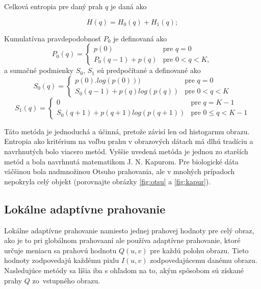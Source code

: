 \documentclass[a4paper,11pt,oneside]{article}%
\begin{document}
 
Celková entropia pre daný prah $q$ je daná ako

\begin{equation}
H(q) =  H_0(q) + H_1(q);
\end{equation}  
 
Kumulatívna pravdepodobnosť $P_0$ je definovaná ako
\begin{equation}
	P_0(q) = \begin{cases} p(0) & \text{pre } q = 0 \\
                            P_0(q-1) + p(q)         & \text{pre } 0 < q < K ,     %
        \end{cases}
 \end{equation} 
a sumačné podmienky $S_0$, $S_1$ sú predpočítané a definované ako
 \begin{equation}   
    S_0(q) = \begin{cases} p(0).log(p(0))) & \text{pre } q = 0 \\
                            S_0(q-1) + p(q)log(p(q))         & \text{pre } 0 < q < K      
        \end{cases}
        \end{equation}
\begin{equation}
	S_1(q) = \begin{cases} 0 & \text{pre } q = K-1 \\
                            S_0(q+1) + p(q+1)log(p(q+1))         & \text{pre } 0 \leq q < K -1      %
        \end{cases}       	 
\end{equation}

Táto metóda je jednoduchá a účinná, pretože závisí len od histogarmu obrazu. %
Entropia ako kritérium na voľbu prahu v obrazových dátach má dlhú tradíciu a navrhnutých bolo viacero metód. Vyššie uvedená metóda je jednou zo starších metód a bola navrhnutá  matematikom J. N. Kapurom.
Pre biologické dáta väčšinou bola nadmnožinou Otsuho prahovania, ale v mnohých prípadoch nepokryla celý objekt (porovnajte obrázky   \ref{fig:otsu}  a   \ref{fig:kapur}). 

\subsection{Lokálne adaptívne prahovanie}

Lokálne adaptívne prahovanie namiesto jednej prahovej hodnoty pre celý obraz, ako je to pri globálnom prahovaaní ale používa adaptívne prahovanie, ktoré určuje meniacu sa prahovú hodnotu $Q(u,v)$ pre každú polohu obrazu. Tieto hodnoty zodpovedajú každému pixlu $I(u,v)$ zodpovedajúcemu danému obrazu. Nasledujúce metódy sa líšia iba s ohľadom na to, akým spôsobom sú získané prahy $Q$ zo~vstupného obrazu. 
\end{document}
